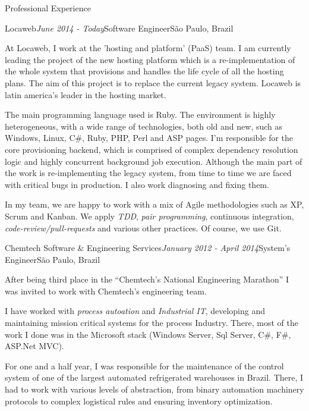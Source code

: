 \documentclass{resume} %
\begin{document}
\begin{rSection}{Professional Experience}
  \begin{rSubsection}{Locaweb}{\em June 2014 - Today}{Software Engineer}{São
      Paulo, Brazil}

  \item At Locaweb, I work at the 'hosting and platform' (PaaS) team. I am
    currently leading the project of the new hosting platform which is a
    re-implementation of the whole system that provisions and handles the
    life cycle of all the hosting plans. The aim of this project is to replace
    the current legacy system. Locaweb is latin america's leader in the hosting
    market.

  \item The main programming language used is Ruby. The environment is highly
    heterogeneous, with a wide range of technologies, both old and new, such as
    Windows, Linux, C\#, Ruby, PHP, Perl and ASP pages. I'm responsible for the
    core provisioning backend, which is comprised of complex dependency
    resolution logic and highly concurrent background job execution. Although
    the main part of the work is re-implementing the legacy system, from time to
    time we are faced with critical bugs in production. I also work diagnosing
    and fixing them.

  \item In my team, we are happy to work with a mix of Agile methodologies such
    as XP, Scrum and Kanban. We apply {\em TDD}, {\em pair programming},
    continuous integration, {\em code-review/pull-requests} and various other
    practices. Of course, we use Git.
  \end{rSubsection}

  \begin{rSubsection}{Chemtech Software \& Engineering Services}{\em January 2012 -
      April 2014}{System's Engineer}{São Paulo, Brazil}

  \item After being third place in the ``Chemtech's National Engineering
    Marathon'' I was invited to work with Chemtech's engineering team.

  \item I have worked with {\em process autoation} and {\em Industrial IT},
    developing and maintaining mission critical systems for the process
    Industry. There, most of the work I done was in the Microsoft stack (Windows
    Server, Sql Server, C\#, F\#, ASP.Net MVC).

  \item For one and a half year, I was responsible for the maintenance of the
    control system of one of the largest automated refrigerated warehouses in
    Brazil. There, I had to work with various levels of abstraction, from binary
    automation machinery protocols to complex logistical rules and ensuring
    inventory optimization.


\end{rSubsection}
\end{rSection}
\end{document}
